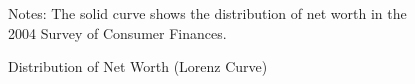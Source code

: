 \begin{figure}
\caption{Distribution of Net Worth (Lorenz Curve)}
\label{CumWLevSCFCastanedaAndDistSevenNoAggShockPlot}
\footnotesize Notes: The solid curve shows the distribution of net worth in the 2004 Survey of Consumer Finances.
\end{figure}

